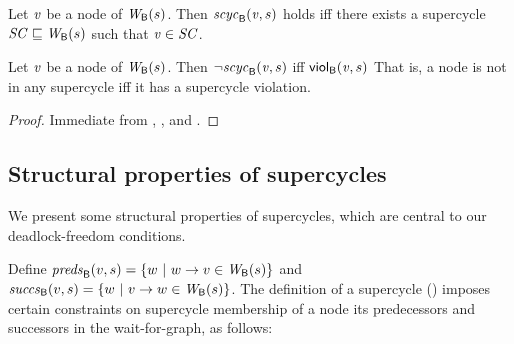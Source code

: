\begin{definition}
\label{defn:supercycle.membership}
Let $\mathit{v}$ be a node of $\mathit{W}_{\mathsf{B}}({s})$. Then $\mathit{scyc}_{\mathsf{B}}({\mathit{v}, s})$ holds iff there exists a supercycle $\mathit{SC} \sqsubseteq \mathit{W}_{\mathsf{B}}({s})$ such that
$\mathit{v} \in \mathit{SC}$.
\end{definition}





\begin{proposition} \label{prop:scViol-iff-notInSC}
Let $\mathit{v}$ be a node of $\mathit{W}_{\mathsf{B}}({s})$. Then $\neg \mathit{scyc}_{\mathsf{B}}({\mathit{v}, s})$ iff $\mathsf{viol}_{\mathsf{B}}(\mathit{v},s)$ %
That is, a node is not in any supercycle iff it has a supercycle violation.
\end{proposition}
%
\begin{proof}
Immediate from , , and .
\end{proof}








\subsection{Structural properties of supercycles}
\label{secn:supercycle-structural}


We present some structural properties of supercycles, which
are central to our deadlock-freedom conditions.


Define
$\mathit{preds}_{\mathsf{B}}({v, s}) = \{ w ~|~ w \rightarrow v \in \mathit{W}_{\mathsf{B}}({s}) \}$ and 
$\mathit{succs}_{\mathsf{B}}({v, s}) = \{ w ~|~ v \rightarrow w \in \mathit{W}_{\mathsf{B}}({s}) \}$.
The definition of a supercycle () 
imposes certain constraints on supercycle membership of a node \wrt its predecessors and successors
in the wait-for-graph, as follows:

